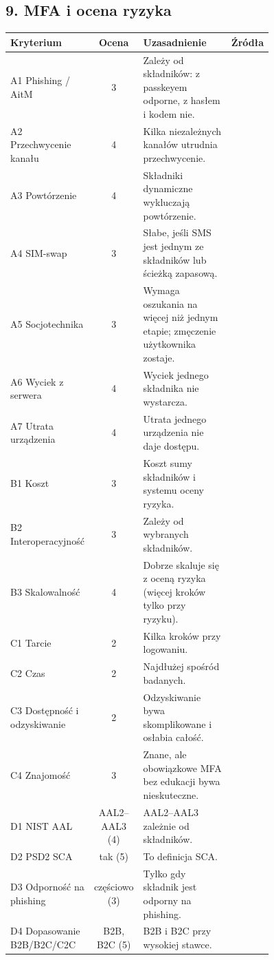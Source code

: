 \subsection*{9. MFA i ocena ryzyka}
\begingroup\small
\begin{longtable}{@{}p{0.2\linewidth}c p{0.56\linewidth}l@{}}
\toprule
Kryterium & Ocena & Uzasadnienie & Źródła \\
\midrule
\endhead
A1 Phishing / AitM & 3 & Zależy od składników: z passkeyem odporne, z hasłem i kodem nie. & \cite{A1,N4} \\
A2 Przechwycenie kanału & 4 & Kilka niezależnych kanałów utrudnia przechwycenie. & \cite{N4,P10} \\
A3 Powtórzenie & 4 & Składniki dynamiczne wykluczają powtórzenie. & \cite{N4} \\
A4 SIM-swap & 3 & Słabe, jeśli SMS jest jednym ze składników lub ścieżką zapasową. & \cite{P11,X2} \\
A5 Socjotechnika & 3 & Wymaga oszukania na więcej niż jednym etapie; zmęczenie użytkownika zostaje. & \cite{A2,P9} \\
A6 Wyciek z serwera & 4 & Wyciek jednego składnika nie wystarcza. & \cite{N4} \\
A7 Utrata urządzenia & 4 & Utrata jednego urządzenia nie daje dostępu. & \cite{N4} \\
B1 Koszt & 3 & Koszt sumy składników i systemu oceny ryzyka. & \cite{P10,P7} \\
B2 Interoperacyjność & 3 & Zależy od wybranych składników. & \cite{P12} \\
B3 Skalowalność & 4 & Dobrze skaluje się z oceną ryzyka (więcej kroków tylko przy ryzyku). & \cite{P10} \\
C1 Tarcie & 2 & Kilka kroków przy logowaniu. & \cite{P9,P8} \\
C2 Czas & 2 & Najdłużej spośród badanych. & \cite{P8} \\
C3 Dostępność i odzyskiwanie & 2 & Odzyskiwanie bywa skomplikowane i osłabia całość. & \cite{P11} \\
C4 Znajomość & 3 & Znane, ale obowiązkowe MFA bez edukacji bywa nieskuteczne. & \cite{P9} \\
D1 NIST AAL & AAL2–AAL3 (4) & AAL2–AAL3 zależnie od składników. & \cite{N1} \\
D2 PSD2 SCA & tak (5) & To definicja SCA. & \cite{N3} \\
D3 Odporność na phishing & częściowo (3) & Tylko gdy składnik jest odporny na phishing. & \cite{N1,A1} \\
D4 Dopasowanie B2B/B2C/C2C & B2B, B2C (5) & B2B i B2C przy wysokiej stawce. & \cite{N4,N7} \\
\bottomrule
\end{longtable}
\endgroup

